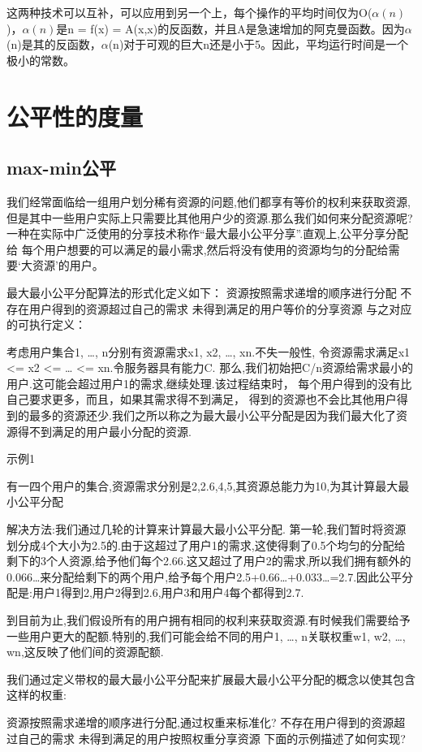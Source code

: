 这两种技术可以互补，可以应用到另一个上，每个操作的平均时间仅为O($\alpha(n)$)，$\alpha(n)$是n = f(x) = A(x,x)的反函数，并且A是急速增加的阿克曼函数。因为$\alpha$(n)是其的反函数，$\alpha$(n)对于可观的巨大n还是小于5。因此，平均运行时间是一个极小的常数。

\section{公平性的度量}
\subsection{max-min公平}
我们经常面临给一组用户划分稀有资源的问题,他们都享有等价的权利来获取资源,
但是其中一些用户实际上只需要比其他用户少的资源.那么我们如何来分配资源呢?
一种在实际中广泛使用的分享技术称作“最大最小公平分享”.直观上,公平分享分配给
每个用户想要的可以满足的最小需求,然后将没有使用的资源均匀的分配给需要‘大资源’的用户。

最大最小公平分配算法的形式化定义如下：
资源按照需求递增的顺序进行分配
不存在用户得到的资源超过自己的需求
未得到满足的用户等价的分享资源
与之对应的可执行定义：

考虑用户集合1, …, n分别有资源需求x1, x2, …, xn.不失一般性,
令资源需求满足x1 <= x2 <= … <= xn.令服务器具有能力C.
那么,我们初始把C/n资源给需求最小的用户.这可能会超过用户1的需求,继续处理.该过程结束时，
每个用户得到的没有比自己要求更多，而且，如果其需求得不到满足，
得到的资源也不会比其他用户得到的最多的资源还少.我们之所以称之为最大最小公平分配是因为我们最大化了资源得不到满足的用户最小分配的资源.

示例1

有一四个用户的集合,资源需求分别是2,2.6,4,5,其资源总能力为10,为其计算最大最小公平分配

解决方法:我们通过几轮的计算来计算最大最小公平分配.
第一轮,我们暂时将资源划分成4个大小为2.5的.由于这超过了用户1的需求,这使得剩了0.5个均匀的分配给剩下的3个人资源,给予他们每个2.66.这又超过了用户2的需求,所以我们拥有额外的0.066…来分配给剩下的两个用户,给予每个用户2.5+0.66…+0.033…=2.7.因此公平分配是:用户1得到2,用户2得到2.6,用户3和用户4每个都得到2.7.

 

到目前为止,我们假设所有的用户拥有相同的权利来获取资源.有时候我们需要给予一些用户更大的配额.特别的,我们可能会给不同的用户1, …, n关联权重w1, w2, …, wn,这反映了他们间的资源配额.

我们通过定义带权的最大最小公平分配来扩展最大最小公平分配的概念以使其包含这样的权重:

资源按照需求递增的顺序进行分配,通过权重来标准化?
不存在用户得到的资源超过自己的需求
未得到满足的用户按照权重分享资源
下面的示例描述了如何实现?


